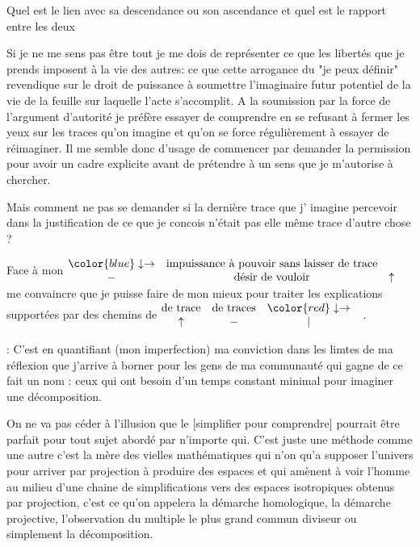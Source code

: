 \documentclass{article}
\newcommand{\blue}[1]{{\color{blue} #1}}
\newcommand{\red}[1]{{\color{red} #1}}
\begin{document}
Quel est le lien avec sa descendance ou son ascendance et quel est le rapport entre les deux 


Si je ne me sens pas être tout je me dois de représenter ce que les libertés que je prends imposent à la vie des autres: ce que cette arrogance du "je peux définir" revendique sur le droit de puissance à soumettre l'imaginaire futur potentiel de la vie de la feuille sur laquelle l'acte s'accomplit. 
A la soumission par la force de l'argument d'autorité je préfère essayer de comprendre en se refusant à fermer les yeux sur les traces qu'on imagine et qu'on se force régulièrement à essayer de réimaginer. 
Il me semble donc d'usage de commencer par demander la permission pour avoir un cadre explicite avant de prétendre à un sens que je m'autorise à chercher. 

Mais comment ne pas se demander   si la dernière trace que j' imagine  percevoir dans la justification de ce que je concois  n'était pas elle même trace d'autre chose ? 

Face à mon 
$\begin{matrix} \blue{\downarrow \rightarrow}  & 
\text{impuissance à pouvoir sans laisser de trace} &\\
-&\text{désir de vouloir}& \uparrow
\end{matrix}$				me convaincre que je puisse faire de mon mieux pour traiter les explications supportées par des   chemins de 
$\begin{matrix} \text{de trace} & \text{de traces} &\red{\downarrow \rightarrow}&\\
				\uparrow&-&|\end{matrix}$.
 
 :
   C'est en quantifiant (mon imperfection)  ma conviction dans les limtes de ma réflexion que j'arrive à borner pour les gens de ma communauté qui gagne de ce fait un nom : ceux qui ont besoin d'un temps constant minimal pour imaginer une décomposition.
   
    On ne va pas céder à l'illusion que le  [simplifier pour comprendre] pourrait être parfait pour tout sujet abordé par n'importe qui. C'est juste une méthode comme une autre c'est la mère des vielles mathématiques qui n'on qu'a supposer l'univers pour arriver par projection à produire des espaces et qui amènent à voir l'homme au milieu d'une chaine de simplifications vers des espaces isotropiques obtenus par projection, c'est ce qu'on appelera la démarche homologique, la démarche projective, l'observation du multiple le plus grand commun diviseur ou simplement la décomposition.  
\end{document}
